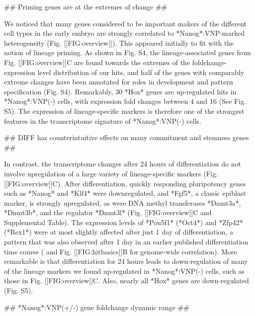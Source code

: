 \documentclass[aps,prl,twocolumn,superscriptaddress]{revtex4}
\begin{document}
## Priming genes are at the extremes of change ##

We noticed that many genes considered to be important makers of the different cell types in the early embryo are strongly correlated to *Nanog*:VNP-marked heterogeneity (Fig. [[FIG:overview]]). This appeared initially to fit with the notion of lineage priming. As shown in Fig. S4, the lineage-associated genes from Fig. [[FIG:overview]]C are found towards the extremes of the foldchange-expression level distribution of our hits, and half of the genes with comparably extreme changes have been annotated for roles in development and pattern specification (Fig. S4). Remarkably, 30 *Hox* genes are up-regulated hits in *Nanog*:VNP(-) cells, with expression fold changes between 4 and 16 (See Fig. S5). 
The expression of lineage-specific markers is therefore one of the strongest features in the transcriptome signature of *Nanog*:VNP(-) cells. 



## DIFF has counterintuitive effects on many commitment and stemness genes ##

In contrast, the transcriptome changes after 24 hours of differentiation do not involve upregulation of a large variety of lineage-specific markers (Fig. [[FIG:overview]]C).  After differentiation, quickly responding pluripotency genes such as *Nanog* and *Klf4* were downregulated, and *Fgf5*, a classic epiblast marker, is strongly upregulated, as were DNA methyl transferases *Dnmt3a*, *Dnmt3b*, and the regulator *Dnmt3l* (Fig. [[FIG:overview]]C and Supplemental Table). The expression levels of *Pou5f1* (*Oct4*) and *Zfp42* (*Rex1*) were at most  slightly affected after just 1 day of differentiation, a pattern that was also observed after 1 day in an earlier published differentiation time course (\citet{HayashiCell11} and Fig. [[FIG:hitbasics]]B for genome-wide correlation). More remarkable is that differentiation for 24 hours leads to down-regulation of many of the lineage markers we found up-regulated in *Nanog*:VNP(-) cells, such as those in Fig. [[FIG:overview]]C. Also, nearly all *Hox* genes are down-regulated (Fig. S5). 


## *Nanog*:VNP(+/-) gene foldchange dynamic range ##
\end{document}
